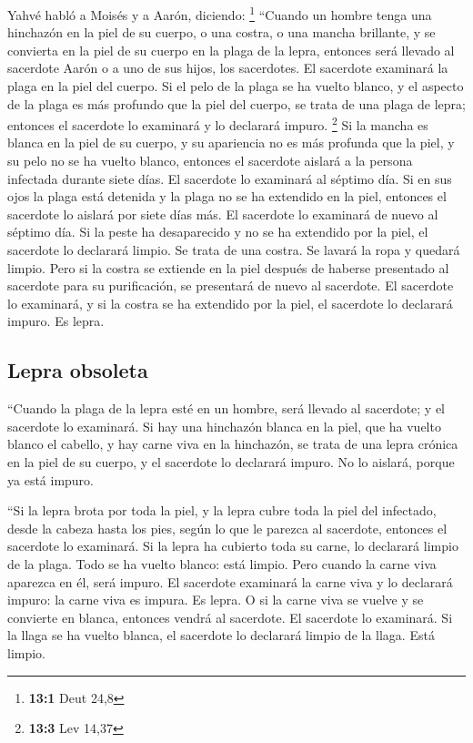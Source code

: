  Yahvé habló a Moisés y a Aarón, diciendo: \footnote{\textbf{13:1}
  Deut 24,8}  ``Cuando un hombre tenga una hinchazón en la
piel de su cuerpo, o una costra, o una mancha brillante, y se convierta
en la piel de su cuerpo en la plaga de la lepra, entonces será llevado
al sacerdote Aarón o a uno de sus hijos, los sacerdotes. 
El sacerdote examinará la plaga en la piel del cuerpo. Si el pelo de la
plaga se ha vuelto blanco, y el aspecto de la plaga es más profundo que
la piel del cuerpo, se trata de una plaga de lepra; entonces el
sacerdote lo examinará y lo declarará impuro. \footnote{\textbf{13:3}
  Lev 14,37}  Si la mancha es blanca en la piel de su
cuerpo, y su apariencia no es más profunda que la piel, y su pelo no se
ha vuelto blanco, entonces el sacerdote aislará a la persona infectada
durante siete días.  El sacerdote lo examinará al séptimo
día. Si en sus ojos la plaga está detenida y la plaga no se ha extendido
en la piel, entonces el sacerdote lo aislará por siete días más.
 El sacerdote lo examinará de nuevo al séptimo día. Si la
peste ha desaparecido y no se ha extendido por la piel, el sacerdote lo
declarará limpio. Se trata de una costra. Se lavará la ropa y quedará
limpio.  Pero si la costra se extiende en la piel después
de haberse presentado al sacerdote para su purificación, se presentará
de nuevo al sacerdote.  El sacerdote lo examinará, y si la
costra se ha extendido por la piel, el sacerdote lo declarará impuro. Es
lepra.

\hypertarget{lepra-obsoleta}{%
\subsection{Lepra obsoleta}\label{lepra-obsoleta}}

 ``Cuando la plaga de la lepra esté en un hombre, será
llevado al sacerdote;  y el sacerdote lo examinará. Si
hay una hinchazón blanca en la piel, que ha vuelto blanco el cabello, y
hay carne viva en la hinchazón,  se trata de una lepra
crónica en la piel de su cuerpo, y el sacerdote lo declarará impuro. No
lo aislará, porque ya está impuro.

 ``Si la lepra brota por toda la piel, y la lepra cubre
toda la piel del infectado, desde la cabeza hasta los pies, según lo que
le parezca al sacerdote,  entonces el sacerdote lo
examinará. Si la lepra ha cubierto toda su carne, lo declarará limpio de
la plaga. Todo se ha vuelto blanco: está limpio.  Pero
cuando la carne viva aparezca en él, será impuro.  El
sacerdote examinará la carne viva y lo declarará impuro: la carne viva
es impura. Es lepra.  O si la carne viva se vuelve y se
convierte en blanca, entonces vendrá al sacerdote.  El
sacerdote lo examinará. Si la llaga se ha vuelto blanca, el sacerdote lo
declarará limpio de la llaga. Está limpio.

